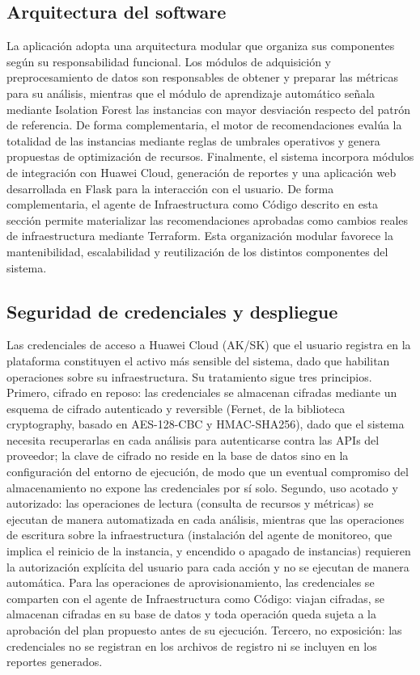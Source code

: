 \subsection{Arquitectura del software}

La aplicación adopta una arquitectura modular que organiza sus
componentes según su responsabilidad funcional. Los módulos de
adquisición y preprocesamiento de datos son responsables de obtener y
preparar las métricas para su análisis, mientras que el módulo de
aprendizaje automático señala mediante Isolation Forest las instancias con
mayor desviación respecto del patrón de referencia. De forma complementaria,
el motor de recomendaciones evalúa la totalidad de las instancias mediante
reglas de umbrales operativos y genera propuestas de optimización de
recursos. Finalmente, el sistema
incorpora módulos de integración con Huawei Cloud, generación de
reportes y una aplicación web desarrollada en Flask para la interacción
con el usuario. De forma complementaria, el agente de Infraestructura como Código descrito en esta sección permite materializar las recomendaciones aprobadas como cambios reales de infraestructura mediante Terraform. Esta organización modular favorece la mantenibilidad,
escalabilidad y reutilización de los distintos componentes del sistema.

\subsection{Seguridad de credenciales y despliegue}

Las credenciales de acceso a Huawei Cloud (AK/SK) que el usuario registra en la plataforma constituyen el activo más sensible del sistema, dado que habilitan operaciones sobre su infraestructura. Su tratamiento sigue tres principios. Primero, cifrado en reposo: las credenciales se almacenan cifradas mediante un esquema de cifrado autenticado y reversible (Fernet, de la biblioteca cryptography, basado en AES-128-CBC y HMAC-SHA256), dado que el sistema necesita recuperarlas en cada análisis para autenticarse contra las APIs del proveedor; la clave de cifrado no reside en la base de datos sino en la configuración del entorno de ejecución, de modo que un eventual compromiso del almacenamiento no expone las credenciales por sí solo. Segundo, uso acotado y autorizado: las operaciones de lectura (consulta de recursos y métricas) se ejecutan de manera automatizada en cada análisis, mientras que las operaciones de escritura sobre la infraestructura (instalación del agente de monitoreo, que implica el reinicio de la instancia, y encendido o apagado de instancias) requieren la autorización explícita del usuario para cada acción y no se ejecutan de manera automática. Para las operaciones de aprovisionamiento, las credenciales se comparten con el agente de Infraestructura como Código: viajan cifradas, se almacenan cifradas en su base de datos y toda operación queda sujeta a la aprobación del plan propuesto antes de su ejecución. Tercero, no exposición: las credenciales no se registran en los archivos de registro ni se incluyen en los reportes generados.

